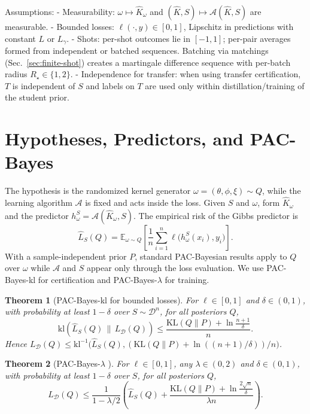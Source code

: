 \documentclass{article}
\newtheorem{theorem}{Theorem}
\begin{document}
Assumptions:
- Measurability: $\omega\mapsto \widehat{K}_\omega$ and $(\widehat{K},S)\mapsto \mathcal{A}(\widehat{K},S)$ are measurable.
- Bounded losses: $\ell(\cdot,y)\in[0,1]$, Lipschitz in predictions with constant $L$ or $L_\gamma$.
- Shots: per-shot outcomes lie in $[-1,1]$; per-pair averages formed from independent or batched sequences. Batching via matchings (Sec.~\ref{sec:finite-shot}) creates a martingale difference sequence with per-batch radius $R_\star\in\{1,2\}$.
- Independence for transfer: when using transfer certification, $T$ is independent of $S$ and labels on $T$ are used only within distillation/training of the student prior.

\section{Hypotheses, Predictors, and PAC-Bayes}\label{sec:hypothesis}
The hypothesis is the randomized kernel generator $\omega=(\theta,\phi,\xi)\sim Q$, while the learning algorithm $\mathcal{A}$ is fixed and acts inside the loss. Given $S$ and $\omega$, form $\widehat{K}_\omega$ and the predictor $h_\omega^S=\mathcal{A}(\widehat{K}_\omega,S)$. The empirical risk of the Gibbs predictor is
\begin{equation}\label{eq:emp-risk}
\hat{L}_S(Q)=\mathbb{E}_{\omega\sim Q}\left[\frac{1}{n}\sum_{i=1}^n \ell\big(h_\omega^S(x_i),y_i\big)\right].
\end{equation}
With a sample-independent prior $P$, standard PAC-Bayesian results apply to $Q$ over $\omega$ while $\mathcal{A}$ and $S$ appear only through the loss evaluation. We use PAC-Bayes-kl for certification and PAC-Bayes-$\lambda$ for training.

\begin{theorem}[PAC-Bayes-kl for bounded losses]\label{thm:pbkl}
For $\ell\in[0,1]$ and $\delta\in(0,1)$, with probability at least $1-\delta$ over $S\sim\mathcal{D}^n$, for all posteriors $Q$,
\[
\mathrm{kl}\!\left(\hat{L}_S(Q)\,\big\|\, L_\mathcal{D}(Q)\right) \le \frac{\mathrm{KL}(Q\|P)+\ln\frac{n+1}{\delta}}{n}.
\]
Hence $L_\mathcal{D}(Q)\le \mathrm{kl}^{-1}\big(\hat{L}_S(Q),(\mathrm{KL}(Q\|P)+\ln((n+1)/\delta))/n\big)$.
\end{theorem}

\begin{theorem}[PAC-Bayes-$\lambda$ \cite{thiemann2017strongly}]\label{thm:pblambda}
For $\ell\in[0,1]$, any $\lambda\in(0,2)$ and $\delta\in(0,1)$, with probability at least $1-\delta$ over $S$, for all posteriors $Q$,
\[
L_\mathcal{D}(Q) \le \frac{1}{1-\lambda/2}\left(\hat{L}_S(Q)+\frac{\mathrm{KL}(Q\|P)+\ln\frac{2\sqrt{n}}{\delta}}{\lambda n}\right).
\]
\end{theorem}
\end{document}
